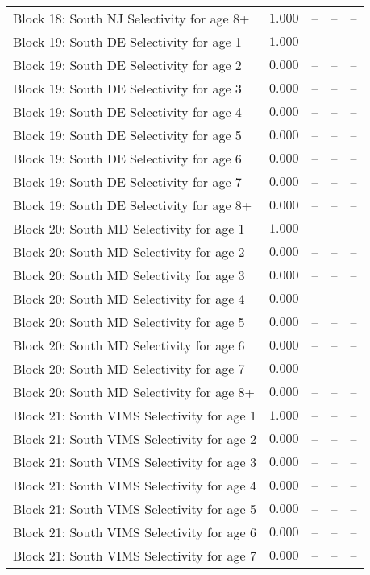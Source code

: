 \documentclass[
]{article}
\begin{document}
\begin{landscape}
\begin{longtable}[t]{lrrrr}
\addlinespace
Block 18: South NJ Selectivity for age 8+ & $1.000$ & -- & -- & --\\
Block 19: South DE Selectivity for age 1 & $1.000$ & -- & -- & --\\
Block 19: South DE Selectivity for age 2 & $0.000$ & -- & -- & --\\
Block 19: South DE Selectivity for age 3 & $0.000$ & -- & -- & --\\
Block 19: South DE Selectivity for age 4 & $0.000$ & -- & -- & --\\
\addlinespace
Block 19: South DE Selectivity for age 5 & $0.000$ & -- & -- & --\\
Block 19: South DE Selectivity for age 6 & $0.000$ & -- & -- & --\\
Block 19: South DE Selectivity for age 7 & $0.000$ & -- & -- & --\\
Block 19: South DE Selectivity for age 8+ & $0.000$ & -- & -- & --\\
Block 20: South MD Selectivity for age 1 & $1.000$ & -- & -- & --\\
\addlinespace
Block 20: South MD Selectivity for age 2 & $0.000$ & -- & -- & --\\
Block 20: South MD Selectivity for age 3 & $0.000$ & -- & -- & --\\
Block 20: South MD Selectivity for age 4 & $0.000$ & -- & -- & --\\
Block 20: South MD Selectivity for age 5 & $0.000$ & -- & -- & --\\
Block 20: South MD Selectivity for age 6 & $0.000$ & -- & -- & --\\
\addlinespace
Block 20: South MD Selectivity for age 7 & $0.000$ & -- & -- & --\\
Block 20: South MD Selectivity for age 8+ & $0.000$ & -- & -- & --\\
Block 21: South VIMS Selectivity for age 1 & $1.000$ & -- & -- & --\\
Block 21: South VIMS Selectivity for age 2 & $0.000$ & -- & -- & --\\
Block 21: South VIMS Selectivity for age 3 & $0.000$ & -- & -- & --\\
\addlinespace
Block 21: South VIMS Selectivity for age 4 & $0.000$ & -- & -- & --\\
Block 21: South VIMS Selectivity for age 5 & $0.000$ & -- & -- & --\\
Block 21: South VIMS Selectivity for age 6 & $0.000$ & -- & -- & --\\
Block 21: South VIMS Selectivity for age 7 & $0.000$ & -- & -- & --\\

\end{longtable}
\end{landscape}
\end{document}
